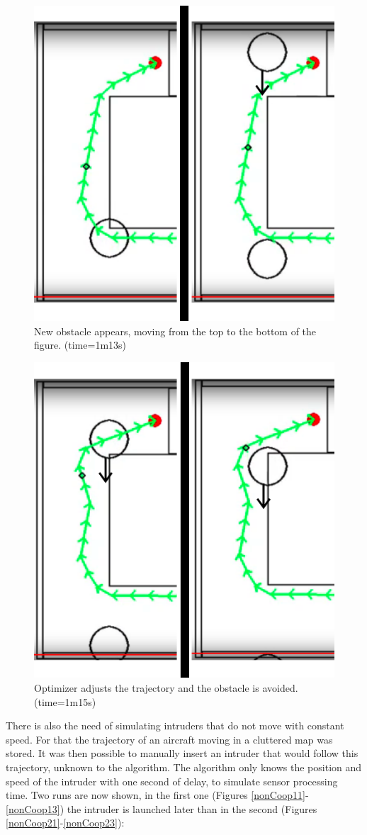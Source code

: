 \begin{figure}[!htb]
    \centering
    \includegraphics[width=0.5\linewidth]{Figures/07_simulation/moving/dodgeMod1.png}
    \caption{New obstacle appears, moving from the top to the bottom of the figure. (time=1m13s)}
    \label{fig:dodM1}
\end{figure}


\begin{figure}[!htb]
    \centering
    \includegraphics[width=0.5\linewidth]{Figures/07_simulation/moving/dodgeMod2.png}
    \caption{Optimizer adjusts the trajectory and the obstacle is avoided. (time=1m15s)}
    \label{fig:dodM2}
\end{figure}

\par

There is also the need of simulating intruders that do not move with constant speed. For that the trajectory of an aircraft moving in a cluttered map was stored. It was then possible to manually insert an intruder that would follow this trajectory, unknown to the algorithm. The algorithm only knows the position and speed of the intruder with one second of delay, to simulate sensor processing time. Two runs are now shown, in the first one (Figures \ref{nonCoop11}-\ref{nonCoop13}) the intruder is launched later than in the second (Figures \ref{nonCoop21}-\ref{nonCoop23}):




